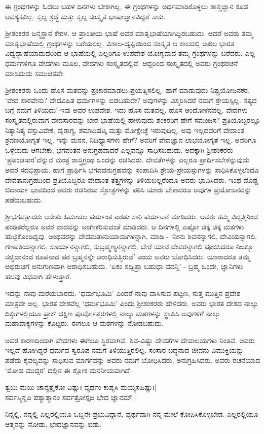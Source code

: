 ಈ ಗ್ರಂಥಗಳನ್ನು ಓದಲು ಬಹಳ ದಿನಗಳು ಬೇಕಾಗಿಲ್ಲ. ಈ ಗ್ರಂಥಗಳನ್ನು ಅರ್ಥಮಾಡಿಕೊಳ್ಳಲು ಶಾಸ್ತ್ರಜ್ಞಾನ ಕೂಡ ಅವಶ್ಯಕವಿಲ್ಲ. ಸ್ವಲ್ಪ ಶ್ರದ್ಧೆ ಮತ್ತು ಸ್ವಲ್ಪ ಸಂಸ್ಕೃತ ಭಾಷಾಜ್ಞಾನವಿದ್ದರೆ ಸಾಕು.

ಶ್ರೀಶಂಕರರ ಜನ್ಮಸ್ಥಾನ ಕೇರಳ. ಆ ಪ್ರಾಂತೀಯ ಭಾಷೆ ಅವರ ಮಾತೃಭಾಷೆಯಾಗಿದ್ದಿರಬಹುದು. ಆದರೆ ಅವರು ತಮ್ಮ ಮಾತೃಭಾಷೆಯಲ್ಲಿ ಗ್ರಂಥಗಳನ್ನು ಬರೆಯಲಿಲ್ಲ. ವಿಶಾಲ-ದೃಷ್ಟಿಯಿಂದ ಸಂಸ್ಕೃತ ಆ ಕಾಲದಲ್ಲಿ ಅಖಿಲ ಭಾರತ ವಿದ್ವದ್ಭಾಷೆಯಾದುದರಿಂದ ಆ ಭಾಷೆಯಲ್ಲಿ ಎಲ್ಲರಿಗೂ ಉಪದೇಶ ಯೋಗ್ಯವಾದ ತಮ್ಮ ಗ್ರಂಥಗಳನ್ನು ಬರೆದರು. ಎಲ್ಲ ಧರ್ಮಗಳಿಗೂ ವೇದಗಳು ಮೂಲ, ವೇದಗಳು ಸಂಸ್ಕೃತದಲ್ಲಿವೆ. ಆದ್ದರಿಂದ ಸಂಸ್ಕೃತದಲ್ಲಿ ಅವರು ಗ್ರಂಥರಚನೆ ಮಾಡಿದುದು ಸಮುಚಿತವೇ.

ಶ್ರೀಶಂಕರರು ಒಂದು ಹೊಸ ಮತವನ್ನು ಪ್ರಚಾರಮಾಡಲು ಪ್ರಯತ್ನಿಸಲಿಲ್ಲ. ಹಾಗೆ ಮಾಡುವುದು ನಿಷ್ಪ್ರಯೋಜನಕರ. `ವೇದ ಸಾರವೇನು? ವೇದವಿಹಿತ ಧರ್ಮಗಳನ್ನು ಬಿಡಬಹುದೇ? ಅವುಗಳನ್ನು ವಿಸ್ಮರಿಸಿದರೆ ನಮಗೆ ಶ್ರೇಯಸ್ಸಿಲ್ಲ. ಸತ್ಯದ ಬಗ್ಗೆ ನಮಗೆ ತಿಳಿಯದು'-ಇವು ಅವರ ಉಪದೇಶ. ಇದು ಹೊಸ ಮತವಲ್ಲ. ಹೊಸ ಆಂದೋಳನವಲ್ಲ. ವೇದಗಳು ಸಂಸ್ಕೃತದಲ್ಲಿರುವಾಗ ವೇದಸಾರವನ್ನು ಬೇರೆ ಭಾಷೆಯಲ್ಲಿ ಹೇಳುವುದು ಶಂಕರರಿಗೆ ಹೇಗೆ ಸಮಂಜಸ? ಪ್ರತಿಯೊಬ್ಬರಲ್ಲೂ ನಿತ್ಯಾನಿತ್ಯ ವಸ್ತುವಿವೇಕ, ವೈರಾಗ್ಯ, ಶಮಾದಿಷಟ್ಕ ಮತ್ತು ಮೋಕ್ಷೇಚ್ಛೆ ಇರುವುದಿಲ್ಲ. ಅವು ಇಲ್ಲದವರಿಗೆ ವೇದಾಂತ ಶ್ರವಣಯೋಗ್ಯತೆ ಇಲ್ಲ. ಇನ್ನು ಮನನ, ನಿದಿಧ್ಯಾಸಗಳು ಹೇಗೆ? ಅವರಿಗೆ ವೇದಜ್ಞಾನ ಲಾಭಯೋಗ್ಯತೆ ಇಲ್ಲ. ಅವರಿಗೂ ಒಳ್ಳೆಯದು ಆಗಬೇಕು. ಭಗವಂತನ ಅನುಗ್ರಹವಾದರೆ ಎಲ್ಲವನ್ನೂ ಸಾಧಿಸಬಹುದು. ಅದಕ್ಕಾಗಿ ಶ್ರೀಶಂಕರರು `ಪ್ರಪಂಚಸಾರ'ವೆನ್ನುವ ಮಂತ್ರ ಶಾಸ್ತ್ರಗ್ರಂಥ ಒಂದನ್ನು ರಚಿಸಿದರು. ದೇವತೆಗಳನ್ನು ಎಲ್ಲರೂ ಪ್ರಾರ್ಥಿಸಬೇಕೆನ್ನುವುದು ಅವರ ಸದಭಿಪ್ರಾಯ. ಹಾಗೆ ಪ್ರಾರ್ಥಿಸಿ ಭಗವದನುಗ್ರಹವನ್ನು ಸಂಪಾದಿಸಿ ಶ್ರೇಯ-ಪ್ರೇಯಸ್ಸುಗಳನ್ನು ಸಾಧಿಸಿಕೊಳ್ಳಲೆಂದೂ ದೇವತಾನುಗ್ರಹದಿಂದ ಪ್ರತಿಯೊಬ್ಬರೂ ವೇದಾಂತ ತತ್ತ್ವಗಳನ್ನು ತಿಳಿಯಬಲ್ಲರೆಂದೂ ಅವರು ಭಾವಿಸಿದರು. ಇಂಥ ದೊಡ್ಡ ಔದಾರ್ಯ ಭಾವದಿಂದ ಅವರು ರಚಿಸಿರುವ ಸ್ತೋತ್ರಗಳನ್ನು ಪಠಿಸಿ ಯಾರು ಬೇಕಾದರೂ ಅವುಗಳ ಪ್ರಯೋಜನವನ್ನು ಪಡೆಯಬಹುದು.

ಶ್ರೀಭಗವತ್ಪಾದರು ಆಸೇತು ಹಿಮಾಚಲ ಪರ್ಯಂತ ಎರಡು ಸಾರಿ ಪರ್ಯಟನೆ ಮಾಡಿದರು. ಅವರು ತಮ್ಮ ವಿದ್ವತ್ತಿನಿಂದ ಪಂಡಿತರೆಲ್ಲರೂ ಅವರ ವಾದವನ್ನು ಅಂಗೀಕರಿಸುವಂತೆ ಮಾಡಿದರು. ಆ ದಿನಗಳಲ್ಲಿ ಎಷ್ಟೋ ಚಿಕ್ಕ ಚಿಕ್ಕ ಮತಗಳು ಹುಟ್ಟಿಕೊಂಡಿದ್ದವು. ಅಂಥವರನ್ನು ವೇದಮತಾನುಯಾಯಿಗಳನ್ನಾಗಿ, ಮಾಡಿ - `ನೀನು ಶಿವನನ್ನಾಗಲಿ, ದೇವಿಯನ್ನಾಗಲಿ, ಗಣಪತಿಯನ್ನಾಗಲಿ, ಸೂರ್ಯನನ್ನಾಗಲಿ, ಸುಬ್ರಹ್ಮಣ್ಯನನ್ನಾಗಲಿ, ಬೇರೆ ಯಾವ ದೇವರನ್ನಾಗಲಿ ಪೂಜಿಸಿದರೂ ನಿಜಕ್ಕೂ ಸಚ್ಚಿದಾನಂದ ರೂಪನಾದ ಪರ ಬ್ರಹ್ಮನನ್ನೇ ಆರಾಧಿಸುತ್ತಿರುವೆ' ಎಂದು ಅವರು ಬೋಧಿಸಿದರು. ಯಾರಾದರೂ ತಮ್ಮ ಅಭಿರುಚಿಗೆ ಅನುಗುಣವಾಗಿ ಆರಾಧಿಸಬಹುದು. `ಏಕಂ ಸದ್ವಿಪ್ರಾ ಬಹುಧಾ ವದನ್ತಿ' - ಬ್ರಹ್ಮ ಒಂದೇ, ಜ್ಞಾನಿಗಳು ಹಲವು ವಿಧವಾಗಿ ಹೇಳುತ್ತಾರೆ.

ಇದನ್ನು ನಾವು ಮರೆಯಬಾರದು. `ಧರ್ಮಭೂಮಿ' ಎಂದರೆ ನಾವು ವಾಸಿಸುವ ಪಟ್ಟ‌ಣ, ಸುತ್ತ ಮುತ್ತಿನ ಪ್ರದೇಶ ಮಾತ್ರವೇ ಅಲ್ಲ. ಭಾರತ ದೇಶವೆಲ್ಲ `ಧರ್ಮಭೂಮಿ' ಎಂದು ಶ್ರೀಶಂಕರರು ಹೇಳಿದರು. ಅವರು ಭಾರತ ದೇಶದ ನಾಲ್ಕು ದಿಕ್ಕುಗಳಲ್ಲಿಯೂ ಪ್ರಾಕ್ ದಕ್ಷಿಣ ಪೂರ್ವೋತ್ತರಗಳಲ್ಲಿ ನಾಲ್ಕು ಮಠಗಳನ್ನು ಸ್ಥಾಪಿಸಿ ಅವುಗಳಿಗೆ ನಾಲ್ಕು ಮಹಾವಾಕ್ಯಗಳನ್ನು ಕೊಟ್ಟರು. ಈಗಲೂ ಆ ಮಠಗಳನ್ನು ನೋಡಬಹುದು.

ಅವರ ಕಾರಣದಿಂದಾಗಿ ವೇದಗಳು ಈಗಲೂ ಸ್ಥಿರವಾಗಿವೆ. ಶಿವ-ವಿಷ್ಣು ದೇವತೆಗಳ ದೇವಾಲಯಗಳು ನಿಂತಿವೆ. ಅವರು ಇಲ್ಲದೆ ಹೋಗಿದ್ದರೆ ಧರ್ಮದ ಸ್ವರೂಪ ನಮಗೆ ತಿಳಿಯುತ್ತಿರಲಿಲ್ಲ. ಸಂಸಾರ ಬದ್ಧನಾದ ಜೀವನು ವಿಮುಕ್ತಿಯನ್ನು ಪಡೆದು ಕೈವಲ್ಯವನ್ನು ಸಾಧಿಸುವ ಮಾರ್ಗವನ್ನು ಅವರು ನಮಗೆ ಬೋಧಿಸಿದರು, ಅನುಗ್ರಹಿಸಿದರು. ಅವರು ರಚನೆಯಾದ `ಮೋಹ ಮುದ್ಗರ' ದಲ್ಲಿನ ಈ ಶ್ಲೋಕ ಮನನೀಯವಾಗಿದೆ.

\begin{shloka}
ತ್ವಯಿ ಮಯಿ ಚಾನ್ಯತ್ರೈಕೋ ವಿಷ್ಣುಃ ವ್ಯರ್ಥಂ ಕುಪ್ಯಸಿ ಮಯ್ಯಸಹಿಷ್ಣುಃ|\\
ಸರ್ವಸ್ಮಿನ್ನಪಿ ಪಶ್ಯಾತ್ಮಾನಂ ಸರ್ವತ್ರೋಸ್ತೃಜ ಭೇದ ಜ್ಞಾನಮ್||
\end{shloka}

ನಿನ್ನಲ್ಲಿ, ನನ್ನಲ್ಲಿ ಎಲ್ಲರಲ್ಲಿಯೂ ಒಬ್ಬನೇ ಪ್ರಭುವಿದ್ದಾನೆ, ವ್ಯರ್ಥವಾಗಿ ನನ್ನ ಮೇಲೆ ಕೋಪಿಸಿಕೊಳ್ಳಬೇಡ. ಎಲ್ಲರಲ್ಲಿಯೂ ಆತ್ಮನನ್ನು ನೋಡು, ಭೇದಜ್ಞಾನವನ್ನು ಬಿಡು.
